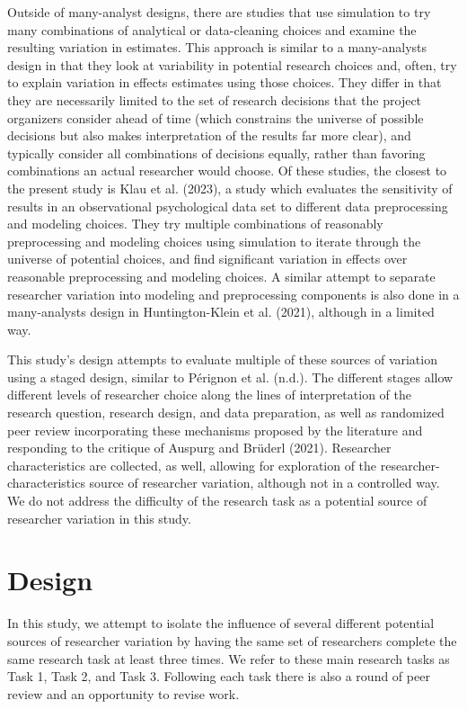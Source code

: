 \documentclass[
  letterpaper,
  DIV=11,
  numbers=noendperiod]{scrartcl}
\begin{document}
Outside of many-analyst designs, there are studies that use simulation
to try many combinations of analytical or data-cleaning choices and
examine the resulting variation in estimates. This approach is similar
to a many-analysts design in that they look at variability in potential
research choices and, often, try to explain variation in effects
estimates using those choices. They differ in that they are necessarily
limited to the set of research decisions that the project organizers
consider ahead of time (which constrains the universe of possible
decisions but also makes interpretation of the results far more clear),
and typically consider all combinations of decisions equally, rather
than favoring combinations an actual researcher would choose. Of these
studies, the closest to the present study is Klau et al. (2023), a study
which evaluates the sensitivity of results in an observational
psychological data set to different data preprocessing and modeling
choices. They try multiple combinations of reasonably preprocessing and
modeling choices using simulation to iterate through the universe of
potential choices, and find significant variation in effects over
reasonable preprocessing and modeling choices. A similar attempt to
separate researcher variation into modeling and preprocessing components
is also done in a many-analysts design in Huntington-Klein et al.
(2021), although in a limited way.

This study's design attempts to evaluate multiple of these sources of
variation using a staged design, similar to Pérignon et al. (n.d.). The
different stages allow different levels of researcher choice along the
lines of interpretation of the research question, research design, and
data preparation, as well as randomized peer review incorporating these
mechanisms proposed by the literature and responding to the critique of
Auspurg and Brüderl (2021). Researcher characteristics are collected, as
well, allowing for exploration of the researcher-characteristics source
of researcher variation, although not in a controlled way. We do not
address the difficulty of the research task as a potential source of
researcher variation in this study.

\hypertarget{design}{%
\section{Design}\label{design}}

In this study, we attempt to isolate the influence of several different
potential sources of researcher variation by having the same set of
researchers complete the same research task at least three times. We
refer to these main research tasks as Task 1, Task 2, and Task 3.
Following each task there is also a round of peer review and an
opportunity to revise work.
\end{document}
